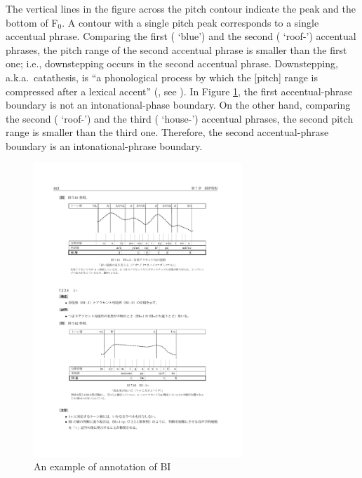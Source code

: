 The vertical lines in the figure across the pitch contour indicate
the peak and the bottom of F$_{0}$.
A contour with a single pitch peak corresponds to a single accentual phrase.
Comparing the first ( `blue') and the second ( `roof-') accentual phrases,
the pitch range of the second accentual phrase is smaller than the first one;
i.e., downstepping occurs in the second accentual phrase.
Downstepping, a.k.a.~catathesis, is ``a phonological process by which the [pitch] range is compressed after a lexical accent'' (, see ).
In Figure \ref{BIexF}, the first accentual-phrase boundary is not an intonational-phase boundary.
On the other hand,
comparing the second ( `roof-') and the third ( `house-') accentual phrases,
the second pitch range is smaller than the third one.
Therefore,
the second accentual-phrase boundary is an intonational-phrase boundary.

\begin{figure}
 \centering
 \includegraphics[width=0.7\textwidth]{figure_BIex.pdf}
 \caption{An example of annotation of BI \cite[][412]{igarashietal06}}
 \label{BIexF}
\end{figure}


